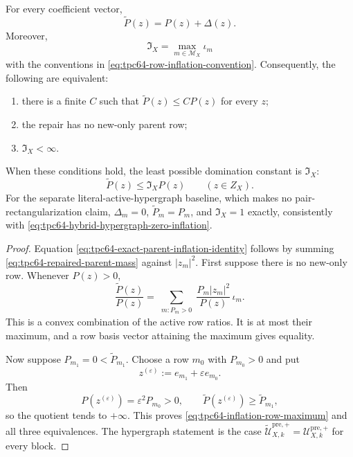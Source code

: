 \begin{theorem}
\label{thm:tpc64-exact-parent-inflation}
For every coefficient vector,
\begin{equation}
 \boxed{\widetilde P(z)=P(z)+\Delta(z).}
 \label{eq:tpc64-exact-parent-inflation-identity}
\end{equation}
Moreover,
\begin{equation}
 \boxed{\mathfrak I_X=\max_{m\in\mathcal M_X}\iota_m}
 \label{eq:tpc64-inflation-row-maximum}
\end{equation}
with the conventions in
\eqref{eq:tpc64-row-inflation-convention}.  Consequently, the following
are equivalent:
\begin{enumerate}[label=\textup{(\roman*)},leftmargin=3em]
 \item there is a finite \(C\) such that
       \(\widetilde P(z)\le C P(z)\) for every \(z\);
 \item the repair has no new-only parent row;
 \item \(\mathfrak I_X<\infty\).
\end{enumerate}
When these conditions hold, the least possible domination constant is
\(\mathfrak I_X\):
\begin{equation}
 \widetilde P(z)\le\mathfrak I_XP(z)
 \qquad(z\in Z_X).
 \label{eq:tpc64-sharp-parent-domination}
\end{equation}
For the separate literal-active-hypergraph baseline, which makes no
pair-rectangularization claim,
\(\Delta_m=0\), \(\widetilde P_m=P_m\), and
\(\mathfrak I_X=1\) exactly, consistently with
\eqref{eq:tpc64-hybrid-hypergraph-zero-inflation}.
\end{theorem}

\begin{proof}
Equation \eqref{eq:tpc64-exact-parent-inflation-identity} follows by
summing \eqref{eq:tpc64-repaired-parent-mass} against \(|z_m|^2\).
First suppose there is no new-only row.  Whenever \(P(z)>0\),
\begin{equation}
 \frac{\widetilde P(z)}{P(z)}
 =
 \sum_{\substack{m:P_m>0}}
 \frac{P_m|z_m|^2}{P(z)}\,\iota_m.
 \label{eq:tpc64-inflation-convex-combination}
\end{equation}
This is a convex combination of the active row ratios.  It is at most
their maximum, and a row basis vector attaining the maximum gives
equality.

Now suppose \(P_{m_1}=0<\widetilde P_{m_1}\).  Choose a row \(m_0\) with
\(P_{m_0}>0\) and put
\[
 z^{(\varepsilon)}:=e_{m_1}+\varepsilon e_{m_0}.
\]
Then
\[
 P(z^{(\varepsilon)})=\varepsilon^2P_{m_0}>0,
 \qquad
 \widetilde P(z^{(\varepsilon)})
 \ge\widetilde P_{m_1},
\]
so the quotient tends to \(+\infty\).  This proves
\eqref{eq:tpc64-inflation-row-maximum} and all three equivalences.  The
hypergraph statement is the case
\(\widetilde{\mathcal U}_{X,k}^{\mathrm{pre},+}
=\mathcal U_{X,k}^{\mathrm{pre},+}\) for every block.
\end{proof}

